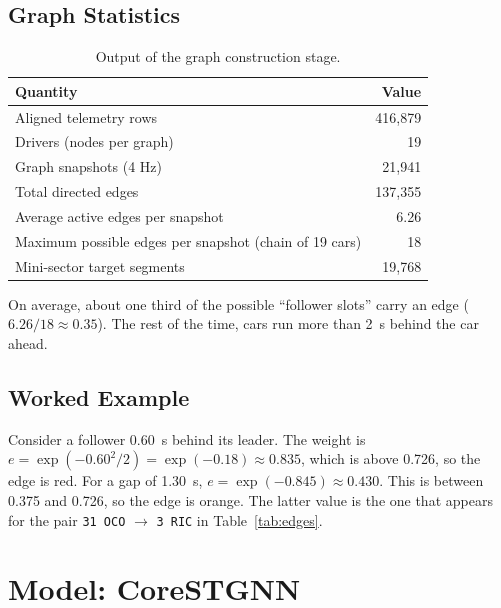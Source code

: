 \documentclass[11pt,a4paper]{article}
\begin{document}
\subsection{Graph Statistics}
\begin{table}[H]
\centering
\caption{Output of the graph construction stage.}
\label{tab:graphstats}
\small
\begin{tabular}{@{}lr@{}}
\toprule
\textbf{Quantity} & \textbf{Value} \\
\midrule
Aligned telemetry rows & 416{,}879 \\
Drivers (nodes per graph) & 19 \\
Graph snapshots (4 Hz) & 21{,}941 \\
Total directed edges & 137{,}355 \\
Average active edges per snapshot & 6.26 \\
Maximum possible edges per snapshot (chain of 19 cars) & 18 \\
Mini-sector target segments & 19{,}768 \\
\bottomrule
\end{tabular}
\end{table}
On average, about one third of the possible ``follower slots'' carry an edge
($6.26 / 18 \approx 0.35$). The rest of the time, cars run more than 2~s behind
the car ahead.

\subsection{Worked Example}
Consider a follower 0.60~s behind its leader. The weight is
$e = \exp(-0.60^2 / 2) = \exp(-0.18) \approx 0.835$, which is above 0.726, so
the edge is red. For a gap of 1.30~s, $e = \exp(-0.845) \approx 0.430$. This is
between 0.375 and 0.726, so the edge is orange. The latter value is the one
that appears for the pair \texttt{31 OCO} $\to$ \texttt{3 RIC} in
Table~\ref{tab:edges}.

\section{Model: CoreSTGNN}
\label{sec:model}
\end{document}
